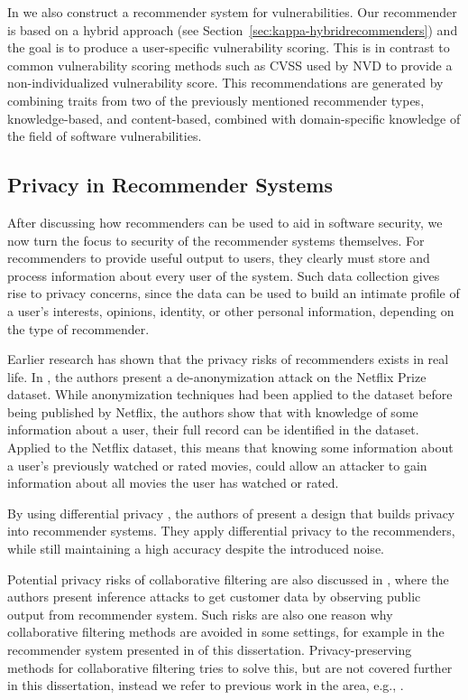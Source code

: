 In  we also construct a recommender system for vulnerabilities.
Our recommender is based on a hybrid approach (see Section~\ref{sec:kappa-hybridrecommenders}) and the goal is to produce a user-specific vulnerability scoring.
This is in contrast to common vulnerability scoring methods such as CVSS \cite{cvss2spec,cvss3spec} used by NVD \cite{nvd} to provide a non-individualized vulnerability score.
This recommendations are generated by combining traits from two of the previously mentioned recommender types, knowledge-based, and content-based, combined with domain-specific knowledge of the field of software vulnerabilities.

\subsection{Privacy in Recommender Systems}
\label{sec:kappa-recsysprivacy}

After discussing how recommenders can be used to aid in software security, we now turn the focus to security of the recommender systems themselves.
For recommenders to provide useful output to users, they clearly must store and process information about every user of the system.
Such data collection gives rise to privacy concerns, since the data can be used to build an intimate profile of a user's interests, opinions, identity, or other personal information, depending on the type of recommender.

Earlier research has shown that the privacy risks of recommenders exists in real life.
In \cite{narayanan:2008}, the authors present a de-anonymization attack on the Netflix Prize dataset.
While anonymization techniques had been applied to the dataset before being published by Netflix, the authors show that with knowledge of some information about a user, their full record can be identified in the dataset.
Applied to the Netflix dataset, this means that knowing some information about a user's previously watched or rated movies, could allow an attacker to gain information about all movies the user has watched or rated.

By using differential privacy \cite{dwork:2006}, the authors of \cite{mcsherry:2009} present a design that builds privacy into recommender systems.
They apply differential privacy to the recommenders, while still maintaining a high accuracy despite the introduced noise.

Potential privacy risks of collaborative filtering are also discussed in \cite{calandrino:2011}, where the authors present inference attacks to get customer data by observing public output from recommender system.
Such risks are also one reason why collaborative filtering methods are avoided in some settings, for example in the recommender system presented in  of this dissertation.
Privacy-preserving methods for collaborative filtering tries to solve this, but are not covered further in this dissertation, instead we refer to previous work in the area, e.g., \cite{zhan:2010,polat:2003,canny:2002,parameswaran:2007,polat:2005}.

